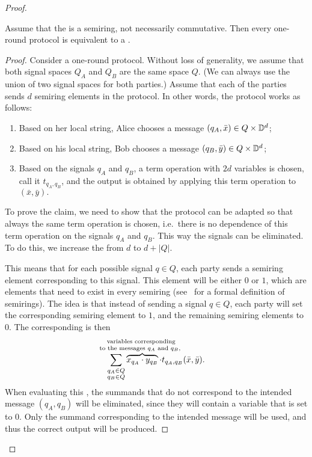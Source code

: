 \begin{proof}
 \begin{claim}
    \label{claim:trivial-messages}
    Assume that the  is a semiring, not necessarily commutative. 
    Then every one-round protocol is equivalent to a .
 \end{claim}
 \begin{proof} 
    Consider a one-round protocol. Without loss of generality, we assume that
    both signal spaces $Q_A$ and $Q_B$ are the same space $Q$. (We can always
    use the union of two signal spaces for both parties.) Assume that each of
    the parties sends $d$ semiring elements in the protocol. In other words, the
    protocol works as follows:
    \begin{enumerate}
        \item Based on her local string, Alice chooses a message $(q_A,\bar x) \in Q \times \mathbb D^d$;
        \item Based on his local string, Bob chooses a message $(q_B,\bar y) \in Q \times \mathbb D^d$;
        \item Based on the signals $q_A$ and $q_B$, a term operation  with $2d$ variables is chosen, call it $t_{q_A,q_B}$, and the output is obtained by applying this term operation to $(\bar x, \bar y).$
    \end{enumerate}
    To prove the claim, we need to show that the protocol can be adapted so
    that always the same term operation is chosen, i.e.~there is no dependence
    of this term operation on the signals $q_A$ and $q_B$. This way the signals
    can be eliminated. To do this, we increase the  from $d$ to $d +
    |Q|$. 

    This means that for each possible signal $q \in Q$, each party sends a
    semiring element corresponding to this signal. This element will be either $0$ or $1$, which are elements that need to exist in every semiring (see~\cite[p.7]{handbook2009} for a formal definition of semirings). The idea is that instead of
    sending a signal $q \in Q$, each party will set the corresponding semiring
    element to $1$, and the remaining semiring elements to $0$. The corresponding
     is then 
    \begin{align*}
    \sum_{\substack{q_A \in Q \\ q_B \in Q}} \myoverbrace{x_{q_A} \cdot y_{q_B}}{variables corresponding \\ to the messages $q_A$ and $q_B$, } \cdot t_{q_A,q_B}(\bar x, \bar y).
    \end{align*}
    When evaluating this ,
    the summands that do not correspond to the intended message $(q_A,q_B)$
    will be eliminated, since they will contain a variable that is set to $0$. 
    Only the summand corresponding to the intended message will be used,
    and thus the correct output will be produced. 
 \end{proof}




\end{proof}
